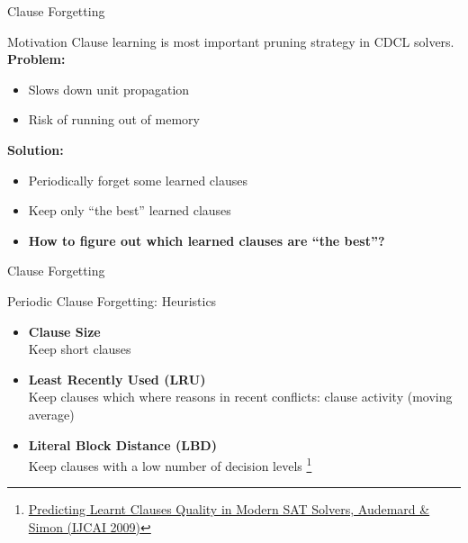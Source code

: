 \documentclass[t]{sdqbeamer}
\begin{document}
\begin{frame}{Clause Forgetting}

\begin{block}{Motivation}
Clause learning is most important pruning strategy in CDCL solvers.\\[1ex]
\textbf{Problem:}
\begin{itemize}
\item Slows down unit propagation
\item Risk of running out of memory
\end{itemize}
\textbf{Solution:}
\begin{itemize}
\item Periodically forget some learned clauses
\item Keep only ``the best'' learned clauses
\item<2> \textbf{How to figure out which learned clauses are ``the best''?}
\end{itemize}
\end{block}
\end{frame}

\begin{frame}{Clause Forgetting}
\begin{block}{Periodic Clause Forgetting: Heuristics}
\begin{itemize}\setlength{\itemsep}{1em}
    \item \textbf{Clause Size}\\[1ex]
    Keep short clauses
    \item \textbf{Least Recently Used (LRU)}\\[1ex]
    Keep clauses which where reasons in recent conflicts: clause activity (moving average)
    \item \textbf{Literal Block Distance (LBD)}\\[1ex]
    Keep clauses with a low number of decision levels%
    \footnote{\href{https://www.ijcai.org/Proceedings/09/Papers/074.pdf}{Predicting Learnt Clauses Quality in Modern SAT Solvers, Audemard \& Simon (IJCAI 2009)}}
\end{itemize}
\end{block}
\end{frame}
    
\end{document}
